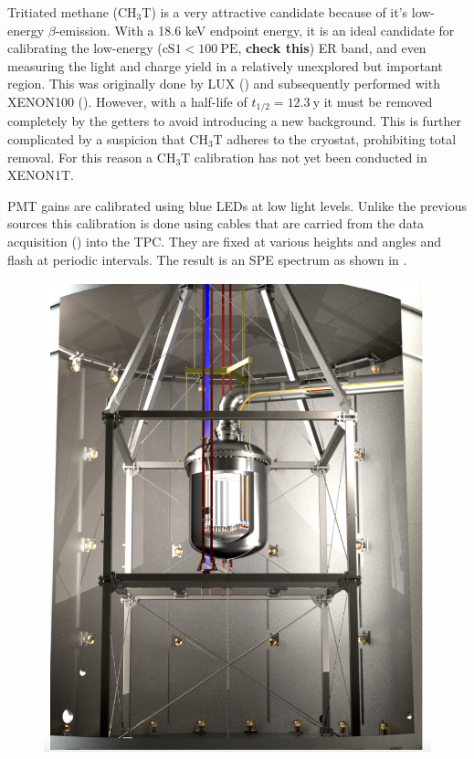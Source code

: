 Tritiated methane ($\mathrm{C H_3 T}$) is a very attractive candidate because of it's low-energy $\beta$-emission.  With a 18.6 keV
endpoint energy, it is an ideal candidate for calibrating the low-energy ($\mathrm{cS1} < 100\ \mathrm{PE}$, \textbf{check this}) ER band,
and even measuring
the light and charge yield in a relatively unexplored but important region.  This was originally done by LUX () and
subsequently performed with XENON100 ().  However, with a half-life of $t_{1/2} = 12.3\ \mathrm{y}$ it must be
removed completely by the getters to avoid introducing a new background.  This is further complicated by a suspicion that
$\mathrm{C H_3 T}$ adheres to the cryostat, prohibiting total removal.  For this reason a $\mathrm{C H_3 T}$ calibration has not yet been
conducted in XENON1T.

PMT gains are calibrated using blue LEDs at low light levels.  Unlike the previous sources this calibration is done using cables that are
carried from the data acquisition () into the TPC.  They are fixed at various heights and angles and flash
at periodic intervals.  The result is an SPE spectrum as shown in .

\begin{figure}
\centering
\includegraphics[width=\textwidth]{WaterTankInside}
\label{fig:water_tank_inside}
\end{figure}



